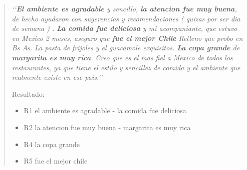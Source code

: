 \begin{quotation}

\emph{
\lq{}\lq{}{\bf El ambiente es agradable} y sencillo, {\bf la atencion fue muy buena}, de hecho ayudaron con sugerencias y recomendaciones ( quizas por ser dia de semana ) .  {\bf La comida fue deliciosa} y mi acompaniante, que estuvo en Mexico 2 meses, aseguro que {\bf fue el mejor Chile} Relleno que probo en Bs As. La pasta de frijoles y el guacamole exquisitos. {\bf La copa grande} de {\bf margarita es muy rica}. Creo que es el mas fiel a Mexico de todos los restaurantes, ya que tiene el estilo y sencillez de comida y el ambiente que realmente existe en ese pais.\rq{}\rq{}
}

Resultado:
\begin{itemize}
\item R1  el ambiente es agradable - la comida fue deliciosa
\item R2  la atencion fue muy buena - margarita es muy rica
\item R4  la copa grande
\item R5  fue el mejor chile
\end{itemize}

\end{quotation}

